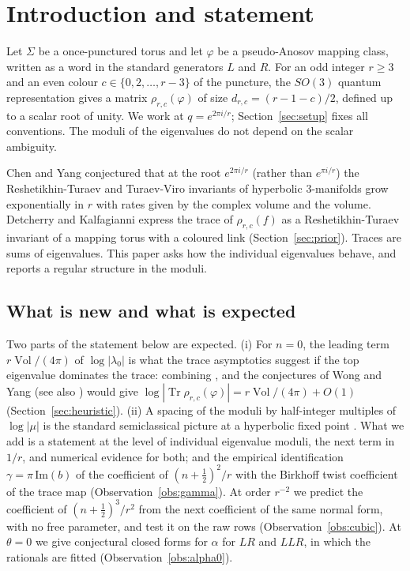 \documentclass[11pt]{amsart}
\theoremstyle{definition}
\theoremstyle{remark}
\newcommand{\Vol}{\operatorname{Vol}}
\newcommand{\Tr}{\operatorname{Tr}}
\begin{document}
\maketitle

\section{Introduction and statement}\label{sec:intro}

Let $\Sigma$ be a once-punctured torus and let $\varphi$ be a pseudo-Anosov mapping
class, written as a word in the standard generators $L$ and $R$. For an odd integer
$r \ge 3$ and an even colour $c \in \{0, 2, \dots, r-3\}$ of the puncture, the
$SO(3)$ quantum representation gives a matrix $\rho_{r,c}(\varphi)$ of size
$d_{r,c} = (r-1-c)/2$, defined up to a scalar root of unity. We work at
$q = e^{2\pi i/r}$; Section~\ref{sec:setup} fixes all conventions. The moduli of the
eigenvalues do not depend on the scalar ambiguity.

Chen and Yang \cite{CY} conjectured that at the root $e^{2\pi i/r}$ (rather than
$e^{\pi i/r}$) the Reshetikhin-Turaev and Turaev-Viro invariants of hyperbolic
$3$-manifolds grow exponentially in $r$ with rates given by the complex volume and
the volume. Detcherry and Kalfagianni \cite{DK} express the trace of
$\rho_{r,c}(f)$ as a Reshetikhin-Turaev invariant of a mapping torus with a coloured
link (Section~\ref{sec:prior}). Traces are sums of eigenvalues. This paper asks how
the individual eigenvalues behave, and reports a regular structure in the moduli.

\subsection*{What is new and what is expected}
Two parts of the statement below are expected. (i) For $n = 0$, the leading term
$r\Vol/(4\pi)$ of $\log|\lambda_0|$ is what the trace asymptotics suggest if the
top eigenvalue dominates the trace: combining \cite{CY}, \cite[Thm.~2.3]{DK} and the
conjectures of Wong and Yang \cite{WY1, WY2} (see also \cite{WY1b}) would give
$\log|\Tr\rho_{r,c}(\varphi)| = r\Vol/(4\pi) + O(1)$
(Section~\ref{sec:heuristic}). (ii) A spacing of the moduli by half-integer multiples
of $\log|\mu|$ is the standard semiclassical picture at a hyperbolic fixed point
\cite{BW, Sj, IS}. What we add is a statement at the level of individual eigenvalue
moduli, the next term in $1/r$, and numerical evidence for both; and the empirical
identification $\gamma = \pi\,\mathrm{Im}(b)$ of the coefficient of
$(n+\frac12)^2/r$ with the Birkhoff twist coefficient of the trace map
(Observation~\ref{obs:gamma}). At order $r^{-2}$ we predict the coefficient of
$(n+\frac12)^3/r^2$ from the next coefficient of the same normal form, with no free
parameter, and test it on the raw rows (Observation~\ref{obs:cubic}). At $\theta = 0$
we give conjectural closed forms for $\alpha$ for $LR$ and $LLR$, in which the
rationals are fitted (Observation~\ref{obs:alpha0}).
\end{document}
